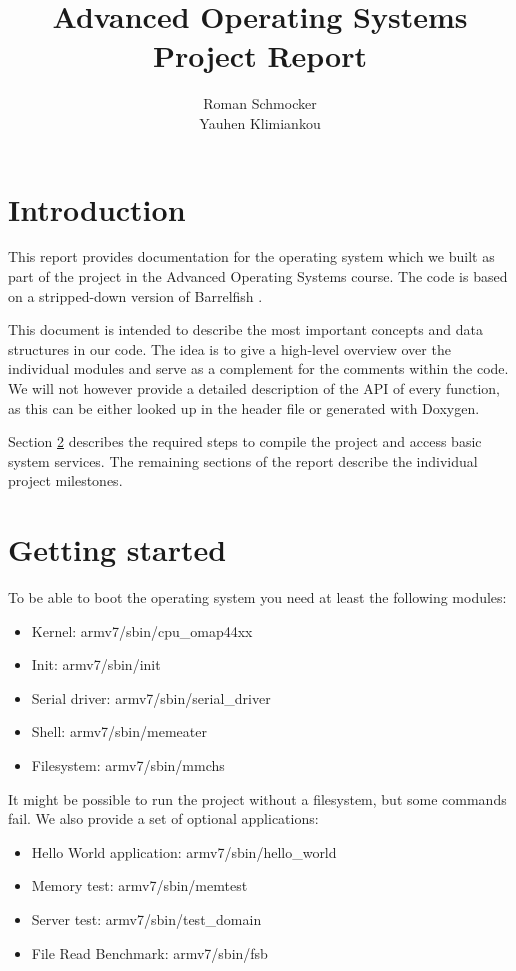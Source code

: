\documentclass[a4paper,10pt]{article}
\title{Advanced Operating Systems \\ Project Report}
\author{Roman Schmocker \\ Yauhen Klimiankou}
\newcommand{\todoref}{\todo{ref}}
\begin{document}
\maketitle


\section{Introduction}

This report provides documentation for the operating system which we built as part of the project in the Advanced Operating Systems course.
The code is based on a stripped-down version of Barrelfish \cite {web:barrelfish}.

This document is intended to describe the most important concepts and data structures in our code.
The idea is to give a high-level overview over the individual modules and serve as a complement for the comments within the code.
We will not however provide a detailed description of the API of every function, as this can be either looked up in the header file or generated with Doxygen\todoref.

Section \ref{sec:getting-started} describes the required steps to compile the project and access basic system services.
The remaining sections of the report describe the individual project milestones.

\section{Getting started}
\label{sec:getting-started}

To be able to boot the operating system you need at least the following modules:
\begin{itemize}
 \item Kernel: armv7/sbin/cpu\_omap44xx
 \item Init: armv7/sbin/init
 \item Serial driver: armv7/sbin/serial\_driver
 \item Shell: armv7/sbin/memeater
 \item Filesystem: armv7/sbin/mmchs
\end{itemize}

It might be possible to run the project without a filesystem, but some commands fail.
We also provide a set of optional applications:
\begin{itemize}
 \item Hello World application: armv7/sbin/hello\_world
 \item Memory test: armv7/sbin/memtest
 \item Server test: armv7/sbin/test\_domain
 \item File Read Benchmark: armv7/sbin/fsb
\end{itemize}
\end{document}

